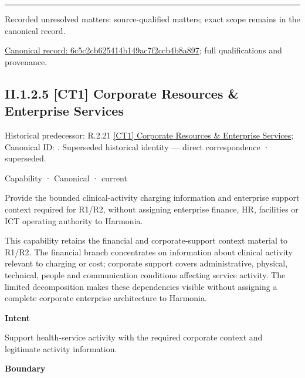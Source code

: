 \medskip\hrule\medskip

{\small Recorded unresolved matters: source-qualified matters; exact scope remains in the canonical record.}\par
{\footnotesize \href{../../../../../../../continuum/strategy/capability/6c5c2cb625414b149ac7f2ccb4b8a897.md}{Canonical record: 6c5c2cb625414b149ac7f2ccb4b8a897}; full qualifications and provenance.}\par
\subsection*{II.1.2.5 [CT1] Corporate Resources \& Enterprise Services}
\label{navigation:II.1.2.5}

{\small Historical predecessor: R.2.21 \hyperref[element:a2dbd74847a44f4c879983229f5c9d08]{[CT1] Corporate Resources \& Enterprise Services}; Canonical ID: \texttt{}. Superseded historical identity — direct correspondence · superseded.}\par
\label{element:b79628f156e14a8cbb82a0dea2fc57ff}
{\small Capability · Canonical · current}\par

Provide the bounded clinical-activity charging information and enterprise support context required for R1/R2, without assigning enterprise finance, HR, facilities or ICT operating authority to Harmonia.



This capability retains the financial and corporate-support context material to R1/R2. The financial branch concentrates on information about clinical activity relevant to charging or cost; corporate support covers administrative, physical, technical, people and communication conditions affecting service activity. The limited decomposition makes these dependencies visible without assigning a complete corporate enterprise architecture to Harmonia.



\textbf{Intent}



Support health-service activity with the required corporate context and legitimate activity information.



\textbf{Boundary}




